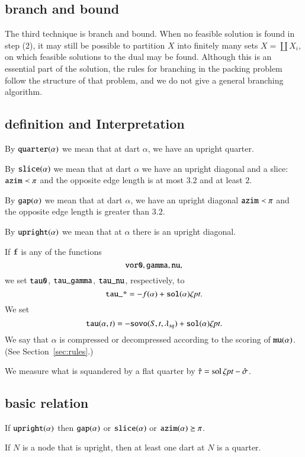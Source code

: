 \subsection{branch and bound}
The third technique is branch and bound.  When no feasible
solution is found in step (2), it may still be possible to
partition $X$ into finitely many sets $X = \coprod X_i$, on which
feasible solutions to the dual may be found.  Although this is an
essential part of the solution, the rules for branching in the
packing problem follow the structure of that problem, and we do
not give a general branching algorithm.


\subsection{definition and Interpretation}

\begin{definition}[quarter]
By ${\operatorname{{\texttt{quarter}}}}(\alpha)$ we mean that at dart $\alpha$, we have
an upright quarter.
\end{definition}

\begin{definition}[slice]
By ${\operatorname{{\texttt{slice}}}}(\alpha)$ we mean that at dart $\alpha$ we have an upright
diagonal and a slice: ${\operatorname{{\texttt{azim}}}}\prec \pi$ and
the opposite edge length is at most $3.2$ and at least $2$.
\end{definition}

\begin{definition}[gap]
By ${\operatorname{{\texttt{gap}}}}(\alpha)$ we mean that at dart $\alpha$, we have an
upright diagonal ${\operatorname{{\texttt{azim}}}}\prec \pi$ and the opposite edge length
is greater than $3.2$.
\end{definition}

\begin{definition}[upright]
By ${\operatorname{{\texttt{upright}}}}(\alpha)$ we mean that at $\alpha$ there is an upright
diagonal.
\end{definition}


If ${\operatorname{{\texttt{f}}}}$ is any of the
functions
    $${\operatorname{{\texttt{vor0}}}},{\operatorname{{\texttt{gamma}}}}, {\operatorname{{\texttt{nu}}}},$$
we set ${\operatorname{{\texttt{tau0}}}}$, ${\operatorname{{\texttt{tau\_gamma}}}}$,
${\operatorname{{\texttt{tau\_nu}}}}$, respectively,
to
    $${\operatorname{{\texttt{tau\_*}}}} = -f(\alpha) +{\operatorname{{\texttt{sol}}}}(\alpha)\zeta\hbox{\it pt}.$$
We set
    $$
    {\operatorname{{\texttt{tau}}}}(\alpha,t) = -
    {\operatorname{{\texttt{sovo}}}}(S,t,\lambda_{sq})+{\operatorname{{\texttt{sol}}}}(\alpha)\zeta\hbox{\it pt}.
    $$
We say that $\alpha$ is compressed or decompressed 
according to the scoring of ${\operatorname{{\texttt{mu}}}}(\alpha)$.  (See
Section~\ref{sec:rules}.)

We  measure what is squandered by a flat quarter by $\hat\tau =
\operatorname{sol}\zeta\hbox{\it pt} - \hat\sigma$.


\subsection{basic relation}

\begin{lemma} If ${\operatorname{{\texttt{upright}}}}(\alpha)$ then ${\operatorname{{\texttt{gap}}}}(\alpha)$ or
${\operatorname{{\texttt{slice}}}}(\alpha)$ or ${\operatorname{{\texttt{azim}}}}(\alpha) \succeq \pi$.
\end{lemma}


\begin{lemma}  If $N$ is a node that is upright, then at least
one dart at $N$ is a quarter.
\end{lemma}



